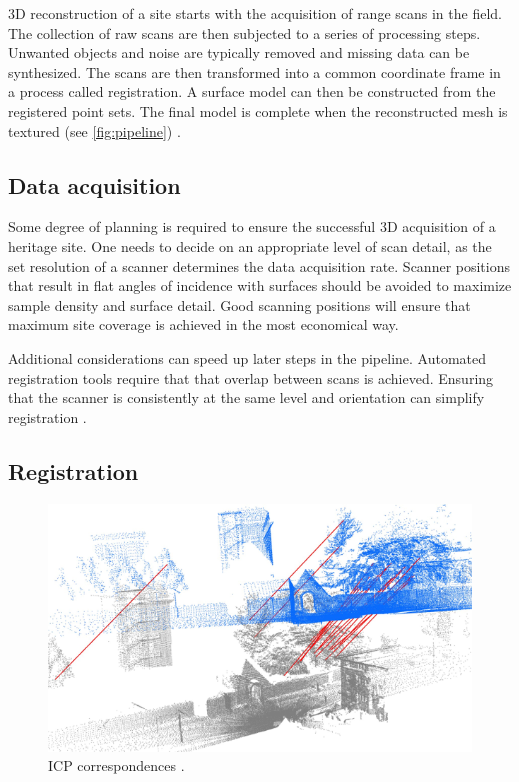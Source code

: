 3D reconstruction of a site starts with the acquisition of range scans in the field. The collection of raw scans are then subjected to a series of processing steps. Unwanted objects and noise are typically removed and missing data can be synthesized. The scans are then transformed into a common coordinate frame in a process called registration. A surface model can then be constructed from the registered point sets. The final model is complete when the reconstructed mesh is textured (see \autoref{fig:pipeline}) \cite{Ruther2011}.

\subsection{Data acquisition}
Some degree of planning is required to ensure the successful 3D acquisition of a heritage site. One needs to decide on an appropriate level of scan detail, as the set resolution of a scanner determines the data acquisition rate. Scanner positions that result in flat angles of incidence with surfaces should be avoided to maximize sample density and surface detail. Good scanning positions will ensure that maximum site coverage is achieved in the most economical way.

Additional considerations can speed up later steps in the pipeline. Automated registration tools require that that overlap between scans is achieved. Ensuring that the scanner is consistently at the same level and orientation can simplify registration \cite{Ruther2011}.

\subsection{Registration}  \label{sec:registration}

\begin{figure}[ht]
  \centering
  \includegraphics[width=0.6\linewidth]{images/registration}
  \caption{ICP correspondences \protect\footnotemark.}
  \label{fig:registration}
\end{figure}


